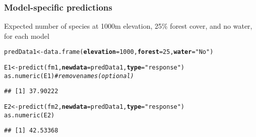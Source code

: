 \documentclass[color=usenames,dvipsnames]{beamer}\usepackage[]{graphicx}\usepackage[]{color}
\makeatletter
\newcommand{\hlnum}[1]{\textcolor[rgb]{0.69,0.494,0}{#1}}%
\newcommand{\hlstr}[1]{\textcolor[rgb]{0.749,0.012,0.012}{#1}}%
\newcommand{\hlcom}[1]{\textcolor[rgb]{0.514,0.506,0.514}{\textit{#1}}}%
\newcommand{\hlstd}[1]{\textcolor[rgb]{0,0,0}{#1}}%
\newcommand{\hlkwb}[1]{\textcolor[rgb]{0,0.341,0.682}{#1}}%
\newcommand{\hlkwc}[1]{\textcolor[rgb]{0,0,0}{\textbf{#1}}}%
\newcommand{\hlkwd}[1]{\textcolor[rgb]{0.004,0.004,0.506}{#1}}%
\newenvironment{kframe}{%
 \def\at@end@of@kframe{}%
 \ifinner\ifhmode%
  \def\at@end@of@kframe{\end{minipage}}%
  \begin{minipage}{\columnwidth}%
 \fi\fi%
 \def\FrameCommand##1{\hskip\@totalleftmargin \hskip-\fboxsep
 \colorbox{shadecolor}{##1}\hskip-\fboxsep
     \hskip-\linewidth \hskip-\@totalleftmargin \hskip\columnwidth}%
 \MakeFramed {\advance\hsize-\width
   \@totalleftmargin\z@ \linewidth\hsize
   \@setminipage}}%
 {\par\unskip\endMakeFramed%
 \at@end@of@kframe}
\newenvironment{knitrout}{}{} %
\makeatother
\begin{document}
\begin{frame}[fragile]
  \frametitle{Model-specific predictions}
  \footnotesize
  {Expected number of species at 1000m elevation, 25\% forest
    cover, and no water, \alert{for each model}}
\begin{knitrout}\scriptsize
{}\color{fgcolor}\begin{kframe}
\begin{alltt}
\hlstd{predData1} \hlkwb{<-} \hlkwd{data.frame}\hlstd{(}\hlkwc{elevation}\hlstd{=}\hlnum{1000}\hlstd{,} \hlkwc{forest}\hlstd{=}\hlnum{25}\hlstd{,} \hlkwc{water}\hlstd{=}\hlstr{"No"}\hlstd{)}
\end{alltt}
\end{kframe}
\end{knitrout}
\pause
\vspace{-7pt}
\begin{knitrout}\scriptsize
{}\color{fgcolor}\begin{kframe}
\begin{alltt}
\hlstd{E1} \hlkwb{<-} \hlkwd{predict}\hlstd{(fm1,} \hlkwc{newdata}\hlstd{=predData1,} \hlkwc{type}\hlstd{=}\hlstr{"response"}\hlstd{)}
\hlkwd{as.numeric}\hlstd{(E1)} \hlcom{# remove names (optional)}
\end{alltt}
\begin{verbatim}
## [1] 37.90222
\end{verbatim}
\end{kframe}
\end{knitrout}
\pause
\vspace{-7pt}
\begin{knitrout}\scriptsize
{}\color{fgcolor}\begin{kframe}
\begin{alltt}
\hlstd{E2} \hlkwb{<-} \hlkwd{predict}\hlstd{(fm2,} \hlkwc{newdata}\hlstd{=predData1,} \hlkwc{type}\hlstd{=}\hlstr{"response"}\hlstd{)}
\hlkwd{as.numeric}\hlstd{(E2)}
\end{alltt}
\begin{verbatim}
## [1] 42.53368
\end{verbatim}
\end{kframe}
\end{knitrout}
\pause
\vspace{-7pt}
\begin{knitrout}\scriptsize

\end{knitrout}
\end{frame}
\end{document}
